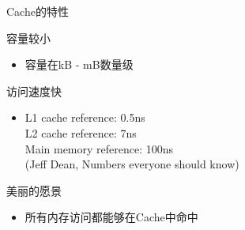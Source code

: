 \documentclass[handout]{beamer}
\begin{document}
\begin{CJK}{UTF8}{gbsn}
\begin{frame}{Cache的特性}
  \begin{block}{容量较小}
    \begin{itemize}
      \item {
          容量在kB - mB数量级
      }
    \end{itemize}
  \end{block}  
  \begin{block}{访问速度快}
    \begin{itemize}
      \item {
          L1 cache reference: 0.5ns \\
          L2 cache reference: 7ns \\
          Main memory reference: 100ns \\
          (Jeff Dean, Numbers everyone should know)
      }
    \end{itemize}
  \end{block}
  \begin{block}{美丽的愿景}
    \begin{itemize}
      \item {
          所有内存访问都能够在Cache中命中
      }
    \end{itemize}
  \end{block}
\end{frame}


\end{CJK}
\end{document}
